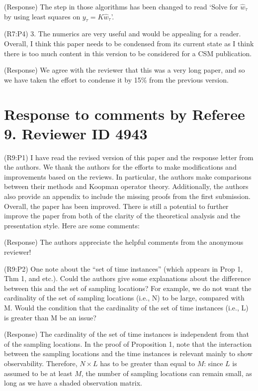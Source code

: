 \documentclass{letter}
\begin{document}
{\color{red}(Response)} The step in those algorithms has been changed to read `Solve for $\hat{w}_{\tau}$ by using least squares on $y_{\tau} = K\hat{w}_{\tau}$'.

{\color{red}(R7:P4)} 3. The numerics are very useful and would be appealing for a reader. Overall, I think this paper needs to be condensed from its current state as I think there is too much content in this version to be considered for a CSM publication.

{\color{red}(Response)} We agree with the reviewer that this was a very long paper, and so we have taken the effort to condense it by 15\% from the previous version.



\section{Response to comments by Referee 9. Reviewer ID 4943}

{\color{red}(R9:P1)} I have read the revised version of this paper and the response letter from the authors. We thank the authors for the efforts to make modifications and improvements based on the reviews. In particular, the authors make comparisons between their methods and Koopman operator theory. Additionally, the authors also provide an appendix to include the missing proofs from the first submission. Overall, the paper has been improved. There is still a potential to further improve the paper from both of the clarity of the theoretical analysis and the presentation style. Here are some comments:  

{\color{red}(Response)} The authors appreciate the helpful comments from the anonymous reviewer!

{\color{red}(R9:P2)} One note about the “set of time instances” (which appears in Prop 1, Thm 1, and etc.). Could the authors give some explanations about the difference between this and the set of sampling locations? For example, we do not want the cardinality of the set of sampling locations (i.e., N) to be large, compared with M. Would the condition that the cardinality of the set of time instances (i.e., L) is greater than M be an issue?

{\color{red}(Response)} The cardinality of the set of time instances is independent from that of the sampling locations. In the proof of Proposition 1, note that the interaction between the sampling locations and the time instances is relevant mainly to show observability. Therefore, $N\times L$ has to be greater than equal to $M$: since $L$ is assumed to be at least $M$, the number of sampling locations can remain small, as long as we have a shaded observation matrix. 
\end{document}
